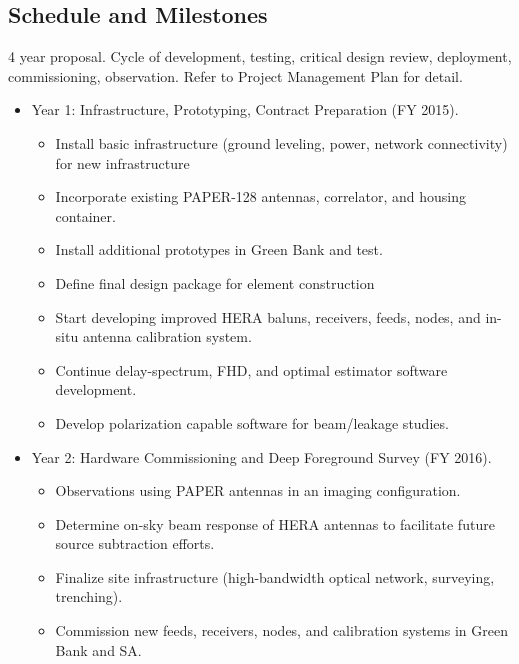 \documentclass[preprint]{aastex}
\begin{document}
%

\subsection{Schedule and Milestones} %

4 year proposal.
Cycle of development, testing, critical design review, deployment, commissioning, observation.
Refer to Project Management Plan for detail.

\begin{itemize}[noitemsep,nolistsep]
\item{Year 1:} Infrastructure, Prototyping, Contract Preparation (FY 2015).      
\begin{itemize}[noitemsep,nolistsep]
\item Install basic infrastructure (ground leveling, power, network connectivity) for new infrastructure
\item Incorporate existing PAPER-128 antennas, correlator, and housing container.
\item Install additional prototypes in Green Bank and test.
\item Define final design package for element construction
\item Start developing improved HERA baluns, receivers, feeds, nodes, and in-situ antenna calibration system.
\item Continue delay-spectrum, FHD, and optimal estimator software development.
\item Develop polarization capable software for beam/leakage studies.
\end{itemize}
\item{Year 2:} Hardware Commissioning and Deep Foreground Survey (FY 2016).  
\begin{itemize}[noitemsep,nolistsep]
\item Observations using PAPER antennas in an imaging configuration.
\item Determine on-sky beam response of HERA antennas to facilitate future source subtraction efforts.
\item Finalize site infrastructure (high-bandwidth optical network, surveying, trenching).
\item Commission new feeds, receivers, nodes, and calibration systems in Green Bank and SA.

\end{itemize}
\end{itemize}
\end{document}
